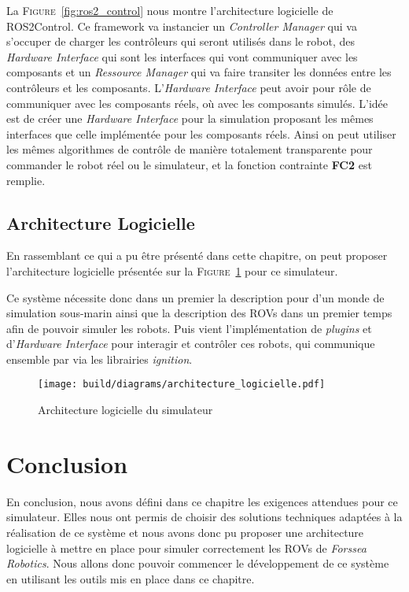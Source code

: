             La \textsc{Figure}~\ref{fig:ros2_control} nous montre l'architecture logicielle de \gls{ROS2Control}. Ce framework va instancier un \textit{Controller Manager} qui va s'occuper de charger les contrôleurs qui seront utilisés dans le robot, des \textit{Hardware Interface} qui sont les interfaces qui vont communiquer avec les composants et un \textit{Ressource Manager} qui va faire transiter les données entre les contrôleurs et les composants. L'\textit{Hardware Interface} peut avoir pour rôle de communiquer avec les composants réels, où avec les composants simulés. L'idée est de créer une \textit{Hardware Interface} pour la simulation proposant les mêmes interfaces que celle implémentée pour les composants réels. Ainsi on peut utiliser les mêmes algorithmes de contrôle de manière totalement transparente pour commander le robot réel ou le simulateur, et la fonction contrainte \textbf{FC2} est remplie.

        \subsection{Architecture Logicielle}

            En rassemblant ce qui a pu être présenté dans cette chapitre, on peut proposer l'architecture logicielle présentée sur la \textsc{Figure}~\ref{fig:architecture_logicielle} pour ce simulateur.
            
            Ce système nécessite donc dans un premier la description pour \gazebo{} d'un monde de simulation sous-marin ainsi que la description des \gls{ROV}s dans un premier temps afin de pouvoir simuler les robots. Puis vient l'implémentation de \textit{plugins} \gazebo{} et d'\textit{Hardware Interface} pour interagir et contrôler ces robots, qui communique ensemble par via les librairies \textit{ignition}.
            
            \begin{figure}[!htb]
                \centering
                \texttt{[image: build/diagrams/architecture\_logicielle.pdf]}
                \caption{Architecture logicielle du simulateur}
                \label{fig:architecture_logicielle}
            \end{figure}

    \section{Conclusion}

        En conclusion, nous avons défini dans ce chapitre les exigences attendues pour ce simulateur. Elles nous ont permis de choisir des solutions techniques adaptées à la réalisation de ce système et nous avons donc pu proposer une architecture logicielle à mettre en place pour simuler correctement les \gls{ROV}s de \textit{Forssea Robotics}. Nous allons donc pouvoir commencer le développement de ce système en utilisant les outils mis en place dans ce chapitre.
        